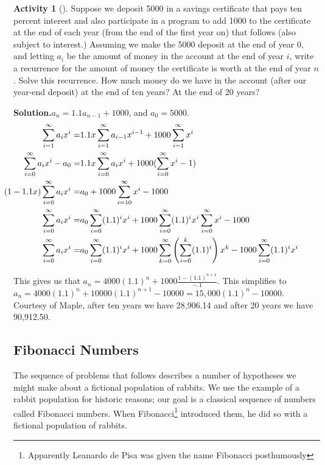 \documentclass[10pt,]{book}
\theoremstyle{plain}
\theoremstyle{definition}
\newtheorem{activity}[project]{Activity}
\numberwithin{equation}{chapter}
\newcommand{\amp}{&}
\begin{document}
\begin{activity}[]\label{activity-184}
Suppose we deposit \textdollar{}5000 in a savings certificate that pays ten percent interest and also participate in a program to add \textdollar{}1000 to the certificate at the end of each year (from the end of the first year on) that follows (also subject to interest.) Assuming we make the \textdollar{}5000 deposit at the end of year 0, and letting \(a_i\) be the amount of money in the account at the end of year \(i\), write a recurrence for the amount of money the certificate is worth at the end of year \(n\). Solve this recurrence. How much money do we have in the account (after our year-end deposit) at the end of ten years?  At the end of 20 years?%
\par\medskip\noindent%
\textbf{Solution.}\quad \(a_n=1.1a_{n-1}+1000\), and \(a_0=5000\).%
\begin{align*}
\sum_{i=1}^\infty
a_ix^i =\amp 1.1x\sum_{i=1}^\infty a_{i-1}x^{i-1} + 1000\sum_{i=1}^\infty x^i\\
\hspace{-.25 in}\sum_{i=0}^\infty a_ix^i -a_0 =\amp
1.1x\sum_{i=0}^\infty a_ix^i +1000(\sum_{i=0}^\infty x^i-1)\\
\hspace{-.5
in}(1-1.1x)\sum_{i=0}^\infty a_ix^i  =\amp  a_0 +1000\sum_{i=10}^\infty x^i-1000\\
\sum_{i=0}^\infty a_i x^i =\amp  a_0\sum_{i=0}^\infty (1.1)^ix^i
+1000\sum_{i=0}^\infty (1.1)^ix^i\sum_{i=0}^\infty x^i -1000\\
\sum_{i=0}^\infty a_i x^i =\amp  a_0\sum_{i=0}^\infty (1.1)^ix^i
+1000\sum_{k=0}^\infty \left(\sum_{i=0}^k(1.1)^i\right)x^k
- 1000\sum_{i=0}^\infty (1.1)^ix^i
\end{align*}
%
\par
This gives us that \(a_n= 4000(1.1)^n +1000 \frac{1-(1.1)^{n+1}}{-.1}\). This simplifies to \(a_n= 4000(1.1)^n+10000(1.1)^{n+1}-10000 =
15,000(1.1)^n-10000\). Courtesy of Maple, after ten years we have \textdollar{}28,906.14 and after 20 years we have \textdollar{}90,912.50.%
\end{activity}
\typeout{************************************************}
\typeout{************************************************}
\subsection[{Fibonacci Numbers}]{Fibonacci Numbers}\label{subsection-47}
The sequence of problems that follows describes a number of hypotheses we might make about a fictional population of rabbits. We use the example of a rabbit population for historic reasons; our goal is a classical sequence of numbers called Fibonacci numbers. When Fibonacci\footnote{Apparently Leanardo de Pisa was given the name Fibonacci posthumously\label{fn-13}} introduced them, he did so with a fictional population of rabbits.%
\typeout{************************************************}
\typeout{************************************************}
\end{document}
